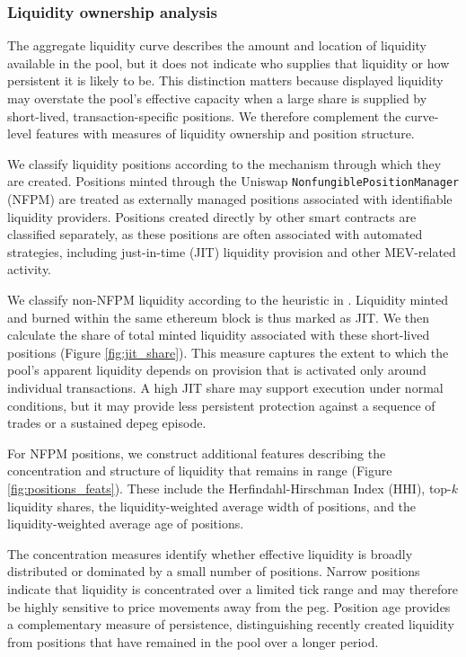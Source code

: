 \documentclass[a4paper,fleqn]{cas-sc}
\begin{document}
\subsubsection{Liquidity ownership analysis}

The aggregate liquidity curve describes the amount and location of liquidity available in the pool, but it does not indicate who supplies that liquidity or how persistent it is likely to be. This distinction matters because displayed liquidity may overstate the pool’s effective capacity when a large share is supplied by short-lived, transaction-specific positions. We therefore complement the curve-level features with measures of liquidity ownership and position structure. 

We classify liquidity positions according to the mechanism through which they are created. Positions minted through the Uniswap \texttt{NonfungiblePositionManager} (NFPM) are treated as externally managed positions associated with identifiable liquidity providers. Positions created directly by other smart contracts are classified separately, as these positions are often associated with automated strategies, including just-in-time (JIT) liquidity provision and other MEV-related activity.

We classify non-NFPM liquidity according to the heuristic in \cite{xiong2023}. Liquidity minted and burned within the same ethereum block is thus marked as JIT. We then calculate the share of total minted liquidity associated with these short-lived positions (Figure \ref{fig:jit_share}). This measure captures the extent to which the pool’s apparent liquidity depends on provision that is activated only around individual transactions. A high JIT share may support execution under normal conditions, but it may provide less persistent protection against a sequence of trades or a sustained depeg episode.

For NFPM positions, we construct additional features describing the concentration and structure of liquidity that remains in range (Figure \ref{fig:positions_feats}). These include the Herfindahl-Hirschman Index (HHI), top-\(k\) liquidity shares, the liquidity-weighted average width of positions, and the liquidity-weighted average age of positions. 

The concentration measures identify whether effective liquidity is broadly distributed or dominated by a small number of positions. Narrow positions indicate that liquidity is concentrated over a limited tick range and may therefore be highly sensitive to price movements away from the peg. Position age provides a complementary measure of persistence, distinguishing recently created liquidity from positions that have remained in the pool over a longer period.
\end{document}
